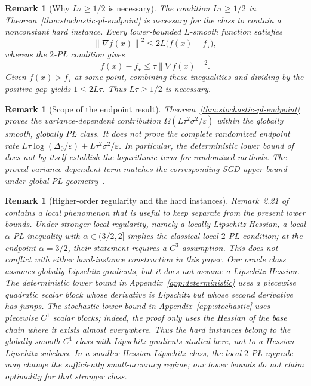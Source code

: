 \documentclass[11pt]{article}
\newtheorem{remark}[theorem]{Remark}
\newcommand{\norm}[1]{\left\lVert #1\right\rVert}
\begin{document}
\begin{remark}[Why $L\tau\ge 1/2$ is necessary]
The condition $L\tau\ge 1/2$ in Theorem~\ref{thm:stochastic-pl-endpoint} is necessary for the class to contain a
nonconstant hard instance. Every lower-bounded $L$-smooth function satisfies
\[
\norm{\nabla f(x)}^2\le 2L\bigl(f(x)-f_\star\bigr),
\]
whereas the $2$-P\L{} condition gives
\[
f(x)-f_\star\le \tau\norm{\nabla f(x)}^2.
\]
Given $f(x)>f_\star$ at some point, combining these inequalities and dividing by the positive gap yields
$1\le 2L\tau$. Thus $L\tau\ge 1/2$ is necessary.
\end{remark}

\begin{remark}[Scope of the endpoint result]
Theorem~\ref{thm:stochastic-pl-endpoint} proves the variance-dependent contribution
$\Omega(L\tau^2\sigma^2/\varepsilon)$ within the globally smooth, globally P\L{} class. It does not prove the complete
randomized endpoint rate
$L\tau\log(\Delta_0/\varepsilon)+L\tau^2\sigma^2/\varepsilon$. In particular, the deterministic lower bound of
\citet{YueFangLin2023} does not by itself establish the logarithmic term for randomized methods. The proved
variance-dependent term matches the corresponding SGD upper bound under global P\L{}
geometry~\citep{FatkhullinEtesamiHeKiyavash2022}.
\end{remark}

\begin{remark}[Higher-order regularity and the hard instances]
\label{rem:higher-order-regularity}
Remark~2.21 of \citet{RebjockBoumal2024} contains a local phenomenon that is useful to keep separate from the
present lower bounds. Under stronger local regularity, namely a locally Lipschitz Hessian, a local
\(\alpha\)-P\L{} inequality with \(\alpha\in(3/2,2]\) implies the classical local \(2\)-P\L{} condition; at the
endpoint \(\alpha=3/2\), their statement requires a \(C^3\) assumption.
This does not conflict with either hard-instance construction in this paper. Our oracle class assumes globally
Lipschitz gradients, but it does not assume a Lipschitz Hessian. The deterministic lower bound in
Appendix~\ref{app:deterministic} uses a piecewise quadratic scalar block whose derivative is Lipschitz but whose second
derivative has jumps. The stochastic lower bound in Appendix~\ref{app:stochastic} uses piecewise \(C^1\) scalar blocks;
indeed, the proof only uses the Hessian of the base chain where it exists almost everywhere. Thus the hard instances
belong to the globally smooth \(C^1\) class with Lipschitz gradients studied here, not to a Hessian-Lipschitz subclass. In a smaller
Hessian-Lipschitz class, the local \(2\)-P\L{} upgrade may change the sufficiently small-accuracy regime; our lower
bounds do not claim optimality for that stronger class.
\end{remark}
\end{document}
